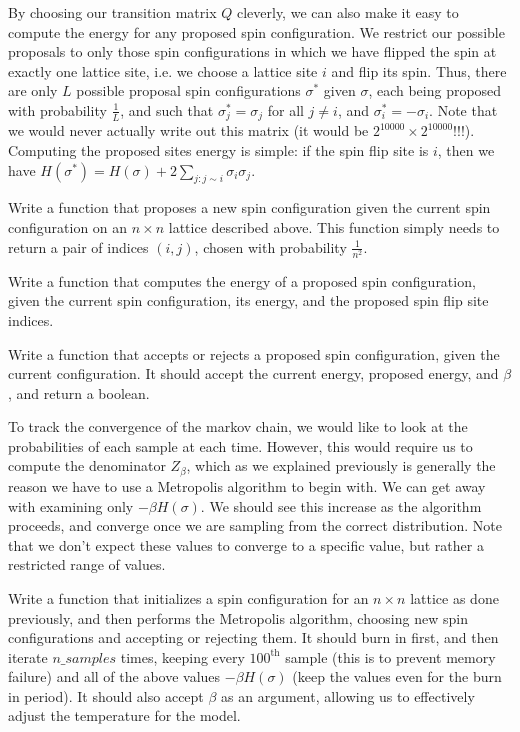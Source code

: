 By choosing our transition matrix $Q$ cleverly, we can also make it easy to compute the energy for any proposed spin configuration. We restrict our possible proposals to only those spin configurations in which we have flipped the spin at exactly one lattice site, i.e. we choose a lattice site $i$ and flip its spin. Thus, there are only $L$ possible proposal spin configurations $\sigma^{*}$ given $\sigma$, each being proposed with probability $\frac{1}{L}$, and such that $\sigma_{j}^{*} = \sigma_{j}$ for all $j \neq i$, and $\sigma_{i}^{*} = - \sigma_{i}$. Note that we would never actually write out this matrix (it would be $2^{10000} \times 2^{10000}$!!!). Computing the proposed sites energy is simple: if the spin flip site is $i$, then we have $H(\sigma^{*}) = H(\sigma) + 2\sum_{j: j \sim i} \sigma_{i}\sigma_{j}$.

\begin{problem}
Write a function that proposes a new spin configuration given the current spin configuration on an $n \times n$ lattice described above. This function simply needs to return a pair of indices $(i,j)$, chosen with probability $\frac{1}{n^{2}}$.
\end{problem}

\begin{problem}
Write a function that computes the energy of a proposed spin configuration, given the current spin configuration, its energy, and the proposed spin flip site indices.
\end{problem}

\begin{problem}
Write a function that accepts or rejects a proposed spin configuration, given the current configuration. It should accept the current energy, proposed energy, and $\beta$, and return a boolean.
\end{problem}

To track the convergence of the markov chain, we would like to look at the probabilities of each sample at each time. However, this would require us to compute the denominator $Z_{\beta}$, which as we explained previously is generally the reason we have to use a Metropolis algorithm to begin with. 
We can get away with examining only $-\beta H(\sigma)$. We should see this increase as the algorithm proceeds, and converge once we are sampling from the correct distribution. Note that we don't expect these values to converge
to a specific value, but rather a restricted range of values.

\begin{problem}
Write a function that initializes a spin configuration for an $n \times n$ lattice as done previously, and then performs the Metropolis algorithm, choosing new spin configurations and accepting or rejecting them. It should burn in first, and then iterate $n\_samples$ times, keeping every $100^{\text{th}}$ sample (this is to prevent memory failure) and all of the above values $-\beta H(\sigma)$ (keep the values even for the burn in period). It should also accept $\beta$ as an argument, allowing us to effectively adjust the temperature for the model.
\end{problem}

